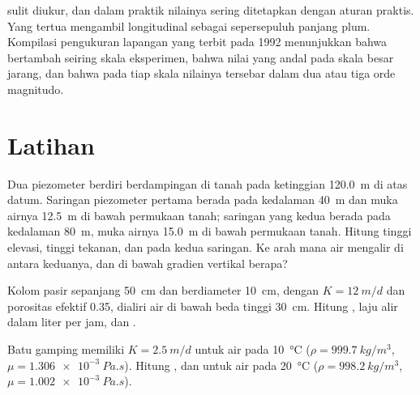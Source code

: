  sulit diukur, dan dalam praktik nilainya sering ditetapkan dengan
aturan praktis. Yang tertua mengambil  longitudinal sebagai sepersepuluh
panjang plum. Kompilasi pengukuran lapangan yang terbit pada
1992 menunjukkan bahwa  bertambah seiring skala eksperimen,
bahwa nilai yang andal pada skala besar jarang, dan bahwa pada tiap skala
nilainya tersebar dalam dua atau tiga orde magnitudo.

\section{Latihan}

\begin{exercise}[$\star$]\label{exo:b3:hydrogeology:1}
Dua piezometer berdiri berdampingan di tanah pada ketinggian \qty{120.0}{m} di atas
datum. Saringan piezometer pertama berada pada kedalaman \qty{40}{m} dan muka airnya
\qty{12.5}{m} di bawah permukaan tanah; saringan yang kedua berada pada kedalaman
\qty{80}{m}, muka airnya \qty{15.0}{m} di bawah permukaan tanah. Hitung tinggi
elevasi, tinggi tekanan, dan  pada kedua saringan. Ke arah mana
air mengalir di antara keduanya, dan di bawah gradien vertikal berapa?
\end{exercise}

\begin{exercise}[$\star$]\label{exo:b3:hydrogeology:2}
Kolom pasir sepanjang \qty{50}{cm} dan berdiameter \qty{10}{cm}, dengan $K =
\qty{12}{m/d}$ dan porositas efektif 0.35, dialiri air di bawah
beda tinggi \qty{30}{cm}. Hitung , laju alir
dalam liter per jam, dan .
\end{exercise}

\begin{exercise}[$\star$]\label{exo:b3:hydrogeology:3}
Batu gamping memiliki $K = \qty{2.5}{m/d}$ untuk air pada \qty{10}{\celsius}
($\rho = \qty{999.7}{kg/m^3}$, $\mu = \qty{1.306e-3}{Pa.s}$). Hitung
, dan  untuk air pada
\qty{20}{\celsius} ($\rho = \qty{998.2}{kg/m^3}$, $\mu =
\qty{1.002e-3}{Pa.s}$).
\end{exercise}

